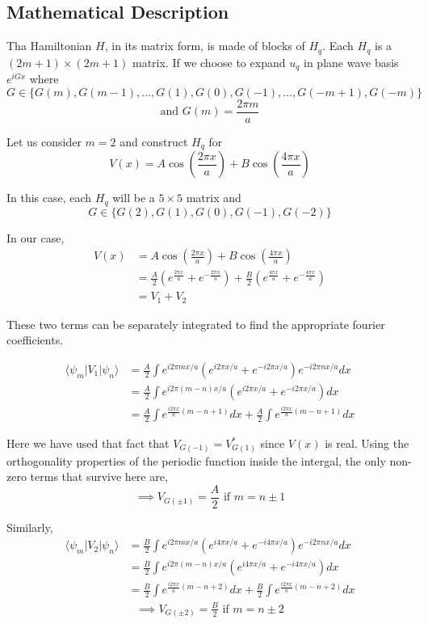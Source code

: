 \documentclass[12pt,a4paper]{article}
\begin{document}
\subsection{Mathematical Description} \label{1.2}
Tha Hamiltonian $H$, in its matrix form, is made of blocks of $H_q$. Each $H_q$ is a $(2m+1) \times (2m+1)$ matrix. If we choose to expand $u_q$ in plane wave basis ${e^{iGx}}$ where $$G \in \{ G(m),G(m-1),...,G(1),G(0),G(-1),...,G(-m+1), G(-m) \}$$ $$\text{and }G(m)=\frac{2\pi m}{a}$$

Let us consider $m=2$ and construct $H_q$ for $$V(x)= A\cos\left(\frac{2\pi x}{a}\right) + B\cos\left(\frac{4\pi x}{a}\right)$$

In this case, each $H_q$ will be a $5 \times 5$ matrix and $$G \in \{ G(2),G(1),G(0),G(-1),G(-2)\}$$

In our case, 
\begin{align*}
    V(x) &= A\cos\left(\frac{2\pi x}{a}\right) + B\cos\left(\frac{4\pi x}{a}\right)\\
    &=\frac{A}{2}\left(e^{\frac{2\pi x}{a}}+e^{-\frac{2\pi x}{a}}\right) + \frac{B}{2}\left(e^{\frac{4\pi x}{a}}+e^{-\frac{4\pi x}{a}}\right)\\
    &= V_1 + V_2
\end{align*}

These two terms can be separately integrated to find the appropriate fourier coefficients.

\begin{align*}
    \langle \psi_m | V_1 | \psi_n \rangle &= \frac{A}{2}\int e^{i2\pi mx/a} \left(e^{i2\pi x/a} + e^{-i2\pi x/a} \right) e^{-i2\pi nx/a} dx\\
    &= \frac{A}{2}\int e^{i2\pi (m-n)x/a} \left(e^{i2\pi x/a} + e^{-i2\pi x/a} \right) dx\\
    &= \frac{A}{2}\int e^{\frac{i2\pi x}{a}(m-n+1)} dx + \frac{A}{2}\int e^{\frac{i2\pi x}{a}(m-n+1)} dx
\end{align*}

Here we have used that fact that $V_{G(-1)} = V^*_{G(1)}$ since $V (x)$ is real.
Using the orthogonality properties of the periodic function inside the intergal, the only non-zero terms that survive here are,
$$\implies \boxed{V_{G(\pm 1)} = \frac{A}{2} \text{ if }m = n \pm 1}$$

Similarly,
\begin{align*}
    \langle \psi_m | V_2 | \psi_n \rangle &= \frac{B}{2}\int e^{i2\pi mx/a} \left(e^{i4\pi x/a} + e^{-i4\pi x/a} \right) e^{-i2\pi nx/a} dx\\
    &= \frac{B}{2}\int e^{i2\pi (m-n)x/a} \left(e^{i4\pi x/a} + e^{-i4\pi x/a} \right) dx\\
    &= \frac{B}{2}\int e^{\frac{i2\pi x}{a}(m-n+2)} dx + \frac{B}{2}\int e^{\frac{i2\pi x}{a}(m-n+2)} dx
\end{align*}
\begin{align*}
    \implies \boxed{V_{G(\pm 2)} = \frac{B}{2} \text{ if }m = n \pm 2}
\end{align*}
\end{document}

